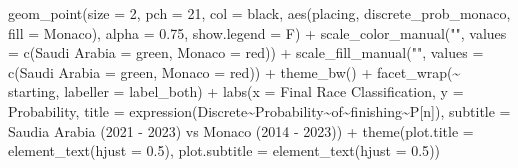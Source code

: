 \documentclass[
]{book}
\newenvironment{Shaded}{\begin{snugshade}}{\end{snugshade}}
\newcommand{\AttributeTok}[1]{\textcolor[rgb]{0.77,0.63,0.00}{#1}}
\newcommand{\DecValTok}[1]{\textcolor[rgb]{0.00,0.00,0.81}{#1}}
\newcommand{\FloatTok}[1]{\textcolor[rgb]{0.00,0.00,0.81}{#1}}
\newcommand{\FunctionTok}[1]{\textcolor[rgb]{0.00,0.00,0.00}{#1}}
\newcommand{\NormalTok}[1]{#1}
\newcommand{\OtherTok}[1]{\textcolor[rgb]{0.56,0.35,0.01}{#1}}
\newcommand{\SpecialCharTok}[1]{\textcolor[rgb]{0.00,0.00,0.00}{#1}}
\newcommand{\StringTok}[1]{\textcolor[rgb]{0.31,0.60,0.02}{#1}}
\begin{document}
\begin{Shaded}
\begin{Highlighting}[]
  \FunctionTok{geom\_point}\NormalTok{(}\AttributeTok{size =} \DecValTok{2}\NormalTok{, }\AttributeTok{pch =} \DecValTok{21}\NormalTok{, }\AttributeTok{col =} \StringTok{\textquotesingle{}black\textquotesingle{}}\NormalTok{, }\FunctionTok{aes}\NormalTok{(placing, discrete\_prob\_monaco, }\AttributeTok{fill =} \StringTok{\textquotesingle{}Monaco\textquotesingle{}}\NormalTok{), }\AttributeTok{alpha =} \FloatTok{0.75}\NormalTok{, }\AttributeTok{show.legend =}\NormalTok{ F) }\SpecialCharTok{+}
  \FunctionTok{scale\_color\_manual}\NormalTok{(}\StringTok{""}\NormalTok{, }\AttributeTok{values =} \FunctionTok{c}\NormalTok{(}\StringTok{\textquotesingle{}Saudi Arabia\textquotesingle{}} \OtherTok{=} \StringTok{\textquotesingle{}green\textquotesingle{}}\NormalTok{, }\StringTok{\textquotesingle{}Monaco\textquotesingle{}} \OtherTok{=} \StringTok{\textquotesingle{}red\textquotesingle{}}\NormalTok{)) }\SpecialCharTok{+}
  \FunctionTok{scale\_fill\_manual}\NormalTok{(}\StringTok{""}\NormalTok{, }\AttributeTok{values =} \FunctionTok{c}\NormalTok{(}\StringTok{\textquotesingle{}Saudi Arabia\textquotesingle{}} \OtherTok{=} \StringTok{\textquotesingle{}green\textquotesingle{}}\NormalTok{, }\StringTok{\textquotesingle{}Monaco\textquotesingle{}} \OtherTok{=} \StringTok{\textquotesingle{}red\textquotesingle{}}\NormalTok{)) }\SpecialCharTok{+}
  \FunctionTok{theme\_bw}\NormalTok{() }\SpecialCharTok{+}
  \FunctionTok{facet\_wrap}\NormalTok{(}\SpecialCharTok{\textasciitilde{}}\NormalTok{ starting, }\AttributeTok{labeller =}\NormalTok{ label\_both) }\SpecialCharTok{+}
  \FunctionTok{labs}\NormalTok{(}\AttributeTok{x =} \StringTok{\textquotesingle{}Final Race Classification\textquotesingle{}}\NormalTok{,}
       \AttributeTok{y =} \StringTok{\textquotesingle{}Probability\textquotesingle{}}\NormalTok{,}
       \AttributeTok{title =} \FunctionTok{expression}\NormalTok{(Discrete}\SpecialCharTok{\textasciitilde{}}\NormalTok{Probability}\SpecialCharTok{\textasciitilde{}}\NormalTok{of}\SpecialCharTok{\textasciitilde{}}\NormalTok{finishing}\SpecialCharTok{\textasciitilde{}}\NormalTok{P[n]),}
       \AttributeTok{subtitle =} \StringTok{\textquotesingle{}Saudia Arabia (2021 {-} 2023) vs Monaco (2014 {-} 2023)\textquotesingle{}}\NormalTok{) }\SpecialCharTok{+}
  \FunctionTok{theme}\NormalTok{(}\AttributeTok{plot.title =} \FunctionTok{element\_text}\NormalTok{(}\AttributeTok{hjust =} \FloatTok{0.5}\NormalTok{),}
        \AttributeTok{plot.subtitle =} \FunctionTok{element\_text}\NormalTok{(}\AttributeTok{hjust =} \FloatTok{0.5}\NormalTok{)) }
\end{Highlighting}
\end{Shaded}
\end{document}
